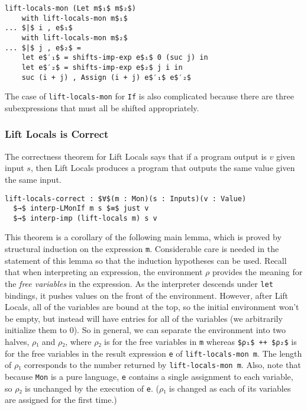\documentclass[sigplan,review,dvipsnames,screen,10pt]{acmart}
\begin{document}
\begin{lstlisting}
lift-locals-mon (Let m$₁$ m$₂$)
    with lift-locals-mon m$₁$
... $|$ i , e$₁$
    with lift-locals-mon m$₂$
... $|$ j , e$₂$ =
    let e$′₁$ = shifts-imp-exp e$₁$ 0 (suc j) in
    let e$′₂$ = shifts-imp-exp e$₂$ j i in
    suc (i + j) , Assign (i + j) e$′₁$ e$′₂$
\end{lstlisting}

The case of \lstinline{lift-locals-mon} for \lstinline{If} is also
complicated because there are three subexpressions that must all be
shifted appropriately.

\subsubsection{Lift Locals is Correct}

The correctness theorem for Lift Locals says that if a program output
is $v$ given input $s$, then Lift Locals produces a program that
outputs the same value given the same input.

\begin{lstlisting}
lift-locals-correct : $∀$(m : Mon)(s : Inputs)(v : Value)
  $→$ interp-LMonIf m s $≡$ just v
  $→$ interp-imp (lift-locals m) s v
\end{lstlisting}

This theorem is a corollary of the following main lemma, which is
proved by structural induction on the expression \lstinline{m}.
Considerable care is needed in the statement of this lemma so that the
induction hypotheses can be used. Recall that when interpreting an
expression, the environment $ρ$ provides the meaning for the
\emph{free variables} in the expression.  As the interpreter descends
under \lstinline{let} bindings, it pushes values on the front of the
environment. However, after Lift Locals, all of the variables are
bound at the top, so the initial environment won't be empty, but
instead will have entries for all of the variables (we arbitrarily
initialize them to $0$). So in general, we can separate the
environment into two halves, $ρ₁$ and $ρ₂$, where $ρ₂$ is for the free
variables in \lstinline{m} whereas \lstinline{$ρ₁$ ++ $ρ₂$} is for the
free variables in the result expression \lstinline{e} of
\lstinline{lift-locals-mon m}. The length of $ρ₁$ corresponds to the
number returned by \lstinline{lift-locals-mon m}. Also, note that
because \lstinline{Mon} is a pure language, \lstinline{e} contains a
single assignment to each variable, so $ρ₂$ is unchanged by the
execution of \lstinline{e}. ($ρ₁$ is changed as each of its variables
are assigned for the first time.)
\end{document}
